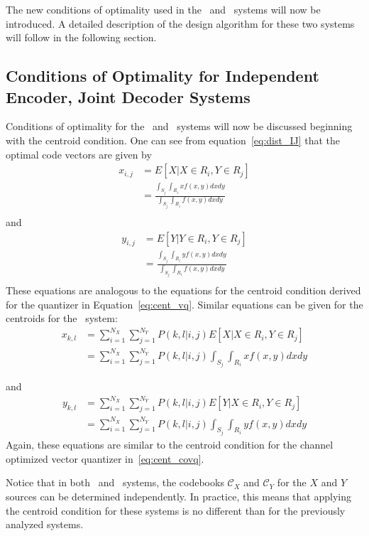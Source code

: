 The new conditions of optimality used in the \sysIJ\ and \sysIJN\ systems will now be introduced. A detailed description of the design algorithm for these two systems will follow in the following section.

\subsection{Conditions of Optimality for Independent Encoder, Joint Decoder Systems}
Conditions of optimality for the \sysIJ\ and \sysIJN\ systems will now be discussed beginning with the centroid condition. One can see from equation~\ref{eq:dist_IJ} that the optimal code vectors are given by
\begin{align}
x_{i,j} &= E[X | X \in R_i, Y \in R_j] \\
&= \frac{ \int_{S_j}\int_{R_i}xf(x,y)dxdy }{ \int_{S_j}\int_{R_i}f(x,y)dxdy } \\
\end{align}
and
\begin{align}
y_{i,j} &= E[Y | Y \in R_i, Y \in R_j] \\
&= \frac{ \int_{S_j}\int_{R_i}yf(x,y)dxdy }{ \int_{S_j}\int_{R_i}f(x,y)dxdy } \\
\end{align}
These equations are analogous to the equations for the centroid condition derived for the quantizer in Equation~\ref{eq:cent_vq}. Similar equations can be given for the centroids for the \sysIJN\ system:
\begin{align}
  x_{k,l} &= \sum_{i=1}^{N_X} \sum_{j=1}^{N_Y} P(k,l|i,j)E[X | X \in R_i, Y \in R_j] \\
  &= \sum_{i=1}^{N_X} \sum_{j=1}^{N_Y} P(k,l|i,j)\int_{S_j} \int_{R_i} xf(x,y)dxdy
\end{align}

and
\begin{align}
  y_{k,l} &= \sum_{i=1}^{N_X} \sum_{j=1}^{N_Y} P(k,l|i,j)E[Y | X \in R_i, Y \in R_j] \\
  &= \sum_{i=1}^{N_X} \sum_{j=1}^{N_Y} P(k,l|i,j)\int_{S_j} \int_{R_i} yf(x,y)dxdy
\end{align}
Again, these equations are similar to the centroid condition for the channel optimized vector quantizer in~\ref{eq:cent_covq}.

Notice that in both \sysIJ\ and \sysIJN\ systems, the codebooks $\mathcal{C}_X$ and $\mathcal{C}_Y$ for the $X$ and $Y$ sources can be determined independently. In practice, this means that applying the centroid condition for these systems is no different than for the previously analyzed systems. 


